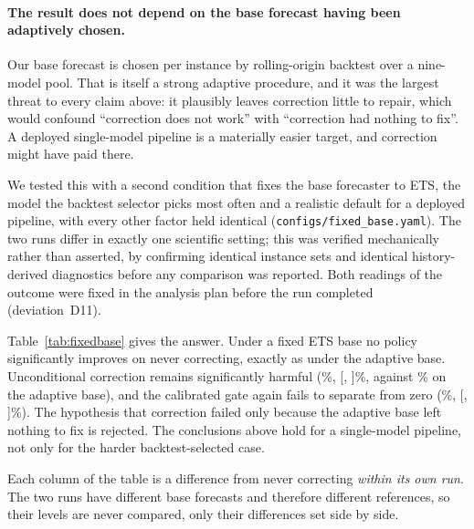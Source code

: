 \paragraph{The result does not depend on the base forecast having been adaptively
chosen.}
Our base forecast is chosen per instance by rolling-origin backtest over a nine-model
pool. That is itself a strong adaptive procedure, and it was the largest threat to
every claim above: it plausibly leaves correction little to repair, which would
confound ``correction does not work'' with ``correction had nothing to fix''. A deployed
single-model pipeline is a materially easier target, and correction might have paid
there.

We tested this with a second condition that fixes the base forecaster to ETS, the model
the backtest selector picks most often and a realistic default for a deployed pipeline,
with every other factor held identical (\texttt{configs/fixed\_base.yaml}). The two
runs differ in exactly one scientific setting; this was verified mechanically rather
than asserted, by confirming identical instance sets and identical history-derived
diagnostics before any comparison was reported. Both readings of the outcome were fixed
in the analysis plan before the run completed (deviation~D11).

Table~\ref{tab:fixedbase} gives the answer. Under a fixed ETS base no policy
significantly improves on never correcting, exactly as under the adaptive base.
Unconditional correction remains significantly harmful (\fbAlwaysCorrectFixedPct\%,
[\fbAlwaysCorrectFixedCIlo, \fbAlwaysCorrectFixedCIhi]\%, against
\fbAlwaysCorrectAdaptivePct\% on the adaptive base), and the calibrated gate again fails
to separate from zero (\fbRgcFixedPct\%, [\fbRgcFixedCIlo, \fbRgcFixedCIhi]\%). The
hypothesis that correction failed only because the adaptive base left nothing to fix is
rejected. The conclusions above hold for a single-model pipeline, not only for the harder
backtest-selected case.

Each column of the table is a difference from never correcting \emph{within its own
run}. The two runs have different base forecasts and therefore different references, so
their levels are never compared, only their differences set side by side.

\begin{table}[htbp]
\centering
\caption{Correction under an adaptive, backtest-selected base beside the same policies
under a fixed ETS base, on identical series, splits and seeds. Each cell is the
series-level MASE difference from never correcting within its own run, with a 95\%
bootstrap interval over series; $\dagger$ marks an interval excluding zero. Positive is
worse. Levels are not shown because the two runs have different references.}
\label{tab:fixedbase}
\small
\fittable{}
\end{table}

